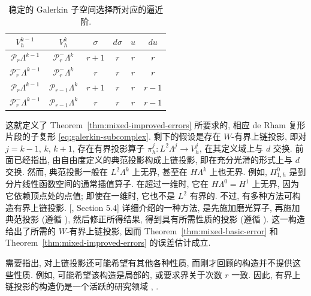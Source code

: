 \begin{table}[htbp]\centering
\caption{{稳定的 Galerkin 子空间选择所对应的逼近阶.}}\label{tab:galerkin-form-approximation-rates}
\begin{tabular}{cc|cccc}\hline
$V_h^{k-1}$&$V_h^k$&$\sigma$&$d\sigma$&$u$&$du$\\\hline
$\mathcal P_r\Lambda^{k-1}$&$\mathcal P_r^-\Lambda^k$&$r+1$&$r$&$r$&$r$\\
$\mathcal P_r^-\Lambda^{k-1}$&$\mathcal P_r^-\Lambda^k$&$r$&$r$&$r$&$r$\\
$\mathcal P_r\Lambda^{k-1}$&$\mathcal P_{r-1}\Lambda^k$&$r+1$&$r$&$r$&$r-1$\\
$\mathcal P_r^-\Lambda^{k-1}$&$\mathcal P_{r-1}\Lambda^k$&$r$&$r$&$r$&$r-1$\\\hline
\end{tabular}
\end{table}

{这就定义了 Theorem~\ref{thm:mixed-improved-errors} 所要求的, 相应 de Rham 复形片段的子复形 \eqref{eq:galerkin-subcomplex}. 剩下的假设是存在 $W$-有界上链投影, 即对 $j=k-1$, $k$, $k+1$, 存在有界投影算子 $\pi_h^j:L^2\Lambda^j\to V_h^j$, 在其定义域上与 $d$ 交换. 前面已经指出, 由自由度定义的典范投影构成上链投影, 即在充分光滑的形式上与 $d$ 交换. 然而, 典范投影一般在 $L^2\Lambda^k$ 上无界, 甚至在 $H\Lambda^k$ 上也无界. 例如, $\Pi_{1,h}^0$ 是到分片线性函数空间的通常插值算子. 在超过一维时, 它在 $H\Lambda^0=H^1$ 上无界, 因为它依赖顶点处的点值; 即使在一维时, 它也不是 $L^2$ 有界的. 不过, 有多种方法可构造有界上链投影. [, Section 5.4] 详细介绍的一种方法, 是先施加磨光算子, 再施加典范投影 (遵循 ), 然后修正所得结果, 得到具有所需性质的投影 (遵循 ). 这一构造给出了所需的 $W$-有界上链投影, 因而 Theorem~\ref{thm:mixed-basic-error} 和 Theorem~\ref{thm:mixed-improved-errors} 的误差估计成立.}

{需要指出, 对上链投影还可能希望有其他各种性质, 而刚才回顾的构造并不提供这些性质. 例如, 可能希望该构造是局部的, 或要求界关于次数 $r$ 一致. 因此, 有界上链投影的构造仍是一个活跃的研究领域 , .}
